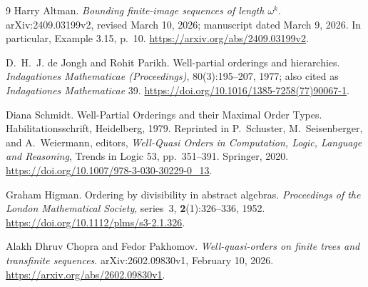 \documentclass[11pt,a4paper]{article}
\numberwithin{equation}{section}
\theoremstyle{definition}
\theoremstyle{remark}
\begin{document}
\begin{thebibliography}{9}
Harry Altman.
\newblock \emph{Bounding finite-image sequences of length $\omega^k$}.
\newblock arXiv:2409.03199v2, revised March 10, 2026; manuscript dated
March 9, 2026. In particular, Example 3.15, p.~10.
\newblock \url{https://arxiv.org/abs/2409.03199v2}.

D.~H.~J. de Jongh and Rohit Parikh.
\newblock Well-partial orderings and hierarchies.
\newblock \emph{Indagationes Mathematicae (Proceedings)}, 80(3):195--207,
1977; also cited as \emph{Indagationes Mathematicae} 39.
\newblock \url{https://doi.org/10.1016/1385-7258(77)90067-1}.

Diana Schmidt.
\newblock Well-Partial Orderings and their Maximal Order Types.
\newblock Habilitationsschrift, Heidelberg, 1979.
\newblock Reprinted in P.~Schuster, M.~Seisenberger, and A.~Weiermann, editors,
\emph{Well-Quasi Orders in Computation, Logic, Language and Reasoning},
Trends in Logic 53, pp.~351--391. Springer, 2020.
\newblock \url{https://doi.org/10.1007/978-3-030-30229-0_13}.

Graham Higman.
\newblock Ordering by divisibility in abstract algebras.
\newblock \emph{Proceedings of the London Mathematical Society}, series~3,
\textbf{2}(1):326--336, 1952.
\newblock \url{https://doi.org/10.1112/plms/s3-2.1.326}.

Alakh Dhruv Chopra and Fedor Pakhomov.
\newblock \emph{Well-quasi-orders on finite trees and transfinite sequences}.
\newblock arXiv:2602.09830v1, February 10, 2026.
\newblock \url{https://arxiv.org/abs/2602.09830v1}.
\end{thebibliography}
\end{document}

